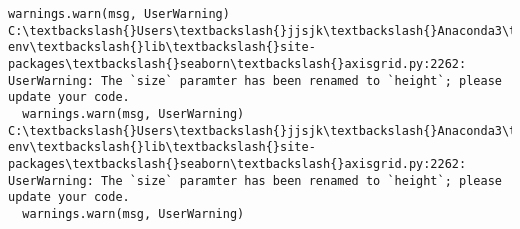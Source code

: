 \documentclass[11pt]{article}
\begin{document}
\begin{Verbatim}[commandchars=\\\{\}]
  warnings.warn(msg, UserWarning)
C:\textbackslash{}Users\textbackslash{}jjsjk\textbackslash{}Anaconda3\textbackslash{}envs\textbackslash{}learn-env\textbackslash{}lib\textbackslash{}site-packages\textbackslash{}seaborn\textbackslash{}axisgrid.py:2262: UserWarning: The `size` paramter has been renamed to `height`; please update your code.
  warnings.warn(msg, UserWarning)
C:\textbackslash{}Users\textbackslash{}jjsjk\textbackslash{}Anaconda3\textbackslash{}envs\textbackslash{}learn-env\textbackslash{}lib\textbackslash{}site-packages\textbackslash{}seaborn\textbackslash{}axisgrid.py:2262: UserWarning: The `size` paramter has been renamed to `height`; please update your code.
  warnings.warn(msg, UserWarning)

    \end{Verbatim}

    \begin{center}
    \end{center}
    { \hspace*{\fill} \\}
    
    \begin{center}
    \end{center}
    { \hspace*{\fill} \\}
    
    \begin{center}
    \end{center}
    { \hspace*{\fill} \\}
    
    \begin{center}
    \end{center}
    { \hspace*{\fill} \\}
    
    \begin{center}
    \end{center}
    { \hspace*{\fill} \\}
    
    \begin{center}
    \end{center}
    { \hspace*{\fill} \\}
    
\end{document}
